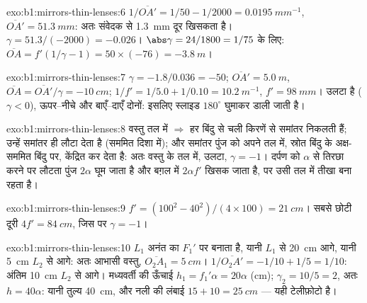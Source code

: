\begin{solution}{exo:b1:mirrors-thin-lenses:6}
$1/\overline{OA'} = 1/50 - 1/2000 = \qty{0.0195}{mm^{-1}}$,
$\overline{OA'} = \qty{51.3}{mm}$: अतः  संवेदक से \qty{1.3}{mm} दूर
खिसकता है। $\gamma = 51.3/(-2000) = -0.026$। $\abs\gamma = 24/1800
= 1/75$ के लिए: $\overline{OA} = f'(1/\gamma - 1) = 50 \times (-76) =
\qty{-3.8}{m}$।
\end{solution}

\begin{solution}{exo:b1:mirrors-thin-lenses:7}
$\gamma = -1.8/0.036 = -50$; $\overline{OA'} = \qty{5.0}{m}$,
$\overline{OA} = \overline{OA'}/\gamma = \qty{-10}{cm}$;
$1/f' = 1/5.0 + 1/0.10 = \qty{10.2}{m^{-1}}$, $f' = \qty{98}{mm}$।
 उलटा है ($\gamma < 0$), ऊपर--नीचे और बाएँ--दाएँ दोनों: इसलिए स्लाइड
$180^\circ$ घुमाकर डाली जाती है।
\end{solution}

\begin{solution}{exo:b1:mirrors-thin-lenses:8}
वस्तु  तल में $\Rightarrow$ हर बिंदु से चली किरणें  से समांतर
निकलती हैं;  उन्हें समांतर ही लौटा देता है (सममित दिशा में); और 
समांतर पुंज को अपने  तल में, स्रोत बिंदु के अक्ष-सममित बिंदु पर, केंद्रित
कर देता है: अतः  वस्तु के तल में, उलटा, $\gamma = -1$। दर्पण को
$\alpha$ से तिरछा करने पर लौटता पुंज $2\alpha$ घूम जाता है और 
बग़ल में $2\alpha f'$ खिसक जाता है, पर उसी तल में तीखा बना रहता है।
\end{solution}

\begin{solution}{exo:b1:mirrors-thin-lenses:9}
$f' = (100^2 - 40^2)/(4 \times 100) = \qty{21}{cm}$। सबसे छोटी दूरी
$4f' = \qty{84}{cm}$, जिस पर $\gamma = -1$।
\end{solution}

\begin{solution}{exo:b1:mirrors-thin-lenses:10}
$L_1$ अनंत का  $F_1'$ पर बनाता है, यानी $L_1$ से \qty{20}{cm} आगे, यानी \qty{5}{cm}
$L_2$ से आगे: अतः आभासी वस्तु, $\overline{O_2A_1} = \qty{+5}{cm}$।
$1/\overline{O_2A'} = -1/10 + 1/5 = 1/10$: अंतिम  \qty{10}{cm}
$L_2$ से आगे। मध्यवर्ती  की ऊँचाई $h_1 = f_1'\alpha = 20\alpha$ (cm);
$\gamma_2 = 10/5 = 2$, अतः $h = 40\alpha$: यानी तुल्य 
\qty{40}{cm}, और नली की लंबाई $15 + 10 = \qty{25}{cm}$ --- यही टेलीफ़ोटो है।
\end{solution}

